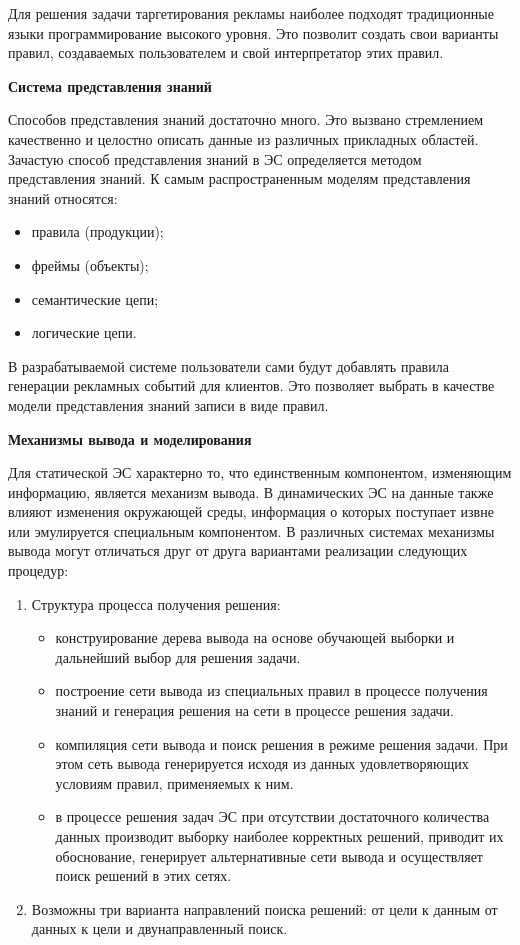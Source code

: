 Для решения задачи таргетирования рекламы наиболее подходят традиционные языки программирование высокого уровня. Это позволит создать свои варианты правил, создаваемых пользователем и свой интерпретатор этих правил. 

\textbf{Система представления знаний}

Способов представления знаний достаточно много. Это вызвано стремлением качественно и целостно описать данные из различных прикладных областей. Зачастую способ представления знаний в ЭС определяется методом представления знаний. К самым распространенным моделям представления знаний относятся:

\begin{itemize}
\item правила (продукции);
\item фреймы (объекты);
\item семантические цепи;
\item логические цепи.
\end{itemize}

В разрабатываемой системе пользователи сами будут добавлять правила генерации рекламных событий для клиентов. Это позволяет выбрать в качестве модели представления знаний записи в виде правил.

\textbf{Механизмы вывода и моделирования}

Для статической ЭС характерно то, что единственным компонентом, изменяющим информацию, является механизм вывода. В динамических ЭС на данные также влияют изменения окружающей среды, информация о которых поступает извне или эмулируется специальным компонентом. В различных системах механизмы вывода могут отличаться друг от друга вариантами реализации следующих процедур:

\begin{enumerate}
\item Структура процесса получения решения:
\begin{itemize}
\item конструирование дерева вывода на основе обучающей выборки и дальнейший выбор для решения задачи.
\item построение сети вывода из специальных правил в процессе получения знаний и генерация решения на сети в процессе решения задачи.
\item компиляция сети вывода и поиск решения в режиме решения задачи. При этом сеть вывода генерируется исходя из данных удовлетворяющих условиям правил, применяемых к ним.
\item в процессе решения задач ЭС при отсутствии достаточного количества данных производит выборку наиболее корректных решений, приводит их обоснование, генерирует альтернативные сети вывода и осуществляет поиск решений в этих сетях.
\end{itemize}

\item Возможны три варианта направлений поиска решений: от цели к данным от данных к цели и двунаправленный поиск.

\end{enumerate}

